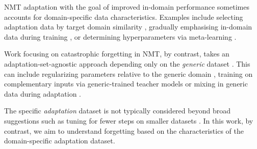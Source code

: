 \documentclass[11pt]{article}
\begin{document}
NMT adaptation with the goal of improved in-domain performance sometimes accounts for  domain-specific data characteristics. Examples include selecting adaptation data by target domain similarity  \cite{aharoni-goldberg-2020-unsupervised}, gradually emphasising in-domain data during training \cite{zhang-etal-2019-curriculum}, or determining  hyperparameters via meta-learning \cite{sharaf-etal-2020-meta}. 

Work focusing on catastrophic forgetting in NMT, by contrast,  takes an adaptation-set-agnostic approach depending only on the \emph{generic} dataset \cite{saunders-2022-domain-jair}. This can include regularizing parameters relative to the generic domain \cite{barone2017regularization}, training on complementary inputs via generic-trained teacher models \cite{shao-feng-2022-overcoming} or mixing in  generic data during adaptation \cite{chu-etal-2017-empirical}. 

The specific \emph{adaptation} dataset is not typically considered beyond broad suggestions such as tuning for fewer steps on smaller datasets \cite{xu-etal-2019-lexical}. In this work, by contrast, we aim to understand  forgetting based on the characteristics of the domain-specific adaptation dataset.
 


\end{document}
